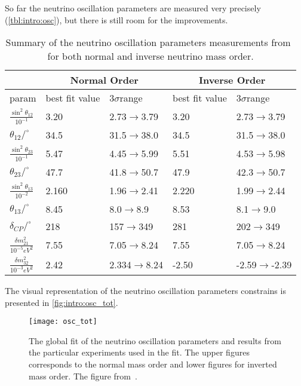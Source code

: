 \documentclass[../main.tex]{subfiles}
\begin{document}
So far the neutrino oscillation parameters are measured very precisely (\autoref{tbl:intro:osc}), but there is still room for the improvements.

\begin{table}[!ht]
\centering
  \begin{tabular}{||l|ll||ll|}
  \hline
  & \multicolumn{2}{c}{Normal Order} & \multicolumn{2}{c}{Inverse Order} \\
  \hline
  param                                   & best fit value  & 3$\sigma$range    & best fit value  & 3$\sigma$range \\
  \hline
  $\frac{\sin^2\theta_{12}}{10^{-1}}$     & 3.20            & 2.73$\to$3.79     & 3.20            & 2.73$\to$3.79 \\
  $\theta_{12}/^\circ$                    & 34.5            & 31.5$\to$38.0     & 34.5            & 31.5$\to$38.0 \\
  $\frac{\sin^2\theta_{23}}{10^{-1}}$     & 5.47            & 4.45$\to$5.99     & 5.51            & 4.53$\to$5.98 \\
  $\theta_{23}/^\circ$                    & 47.7            & 41.8$\to$50.7     & 47.9            & 42.3$\to$50.7 \\
  $\frac{\sin^2\theta_{13}}{10^{-2}}$     & 2.160           & 1.96$\to$2.41     & 2.220           & 1.99$\to$2.44 \\
  $\theta_{13}/^\circ$                    & 8.45            & 8.0$\to$8.9       & 8.53            & 8.1$\to$9.0 \\
  $\delta_{CP}/^\circ$                    & 218             & 157$\to$349       & 281             & 202$\to$349 \\
  $\frac{\delta m_{21}^2}{10^{-5}eV^2}$   & 7.55            & 7.05$\to$8.24     & 7.55            & 7.05$\to$8.24 \\
  $\frac{\delta m_{32}^2}{10^{-3}eV^2}$   & 2.42            & 2.334$\to$8.24    & -2.50           & -2.59$\to$-2.39 \\
  \hline

  \end{tabular}
  \caption{Summary of the neutrino oscillation parameters measurements from~\cite{Tanabashi2018} for both normal and inverse neutrino mass order.}
  \label{tbl:intro:osc}
\end{table}

The visual representation of the neutrino oscillation parameters constrains is presented in \autoref{fig:intro:osc_tot}.

\begin{figure}
  \centering
  \texttt{[image: osc\_tot]}
  \caption{The global fit of the neutrino oscillation parameters and results from the particular experiments used in the fit. The upper figures corresponds to the normal mass order and lower figures for inverted mass order. The figure from~\cite{Esteban2019}.}
  \label{fig:intro:osc_tot}
\end{figure}
\end{document}
